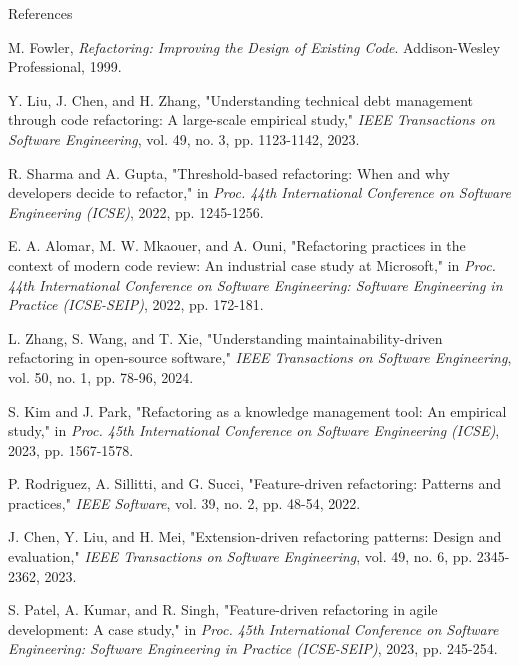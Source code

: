 \documentclass{beamer}
\begin{document}
\begin{frame}[allowframebreaks]{References}
    
    \begin{thebibliography}{10}
         M. Fowler, \textit{Refactoring: Improving the Design of Existing Code}. Addison-Wesley Professional, 1999.
        
         Y. Liu, J. Chen, and H. Zhang, "Understanding technical debt management through code refactoring: A large-scale empirical study," \textit{IEEE Transactions on Software Engineering}, vol. 49, no. 3, pp. 1123-1142, 2023.
        
         R. Sharma and A. Gupta, "Threshold-based refactoring: When and why developers decide to refactor," in \textit{Proc. 44th International Conference on Software Engineering (ICSE)}, 2022, pp. 1245-1256.
        
         E. A. Alomar, M. W. Mkaouer, and A. Ouni, "Refactoring practices in the context of modern code review: An industrial case study at Microsoft," in \textit{Proc. 44th International Conference on Software Engineering: Software Engineering in Practice (ICSE-SEIP)}, 2022, pp. 172-181.
        
         L. Zhang, S. Wang, and T. Xie, "Understanding maintainability-driven refactoring in open-source software," \textit{IEEE Transactions on Software Engineering}, vol. 50, no. 1, pp. 78-96, 2024.
        
         S. Kim and J. Park, "Refactoring as a knowledge management tool: An empirical study," in \textit{Proc. 45th International Conference on Software Engineering (ICSE)}, 2023, pp. 1567-1578.
        
         P. Rodriguez, A. Sillitti, and G. Succi, "Feature-driven refactoring: Patterns and practices," \textit{IEEE Software}, vol. 39, no. 2, pp. 48-54, 2022.
        
         J. Chen, Y. Liu, and H. Mei, "Extension-driven refactoring patterns: Design and evaluation," \textit{IEEE Transactions on Software Engineering}, vol. 49, no. 6, pp. 2345-2362, 2023.
        
         S. Patel, A. Kumar, and R. Singh, "Feature-driven refactoring in agile development: A case study," in \textit{Proc. 45th International Conference on Software Engineering: Software Engineering in Practice (ICSE-SEIP)}, 2023, pp. 245-254.
        

\end{thebibliography}
\end{frame}
\end{document}
